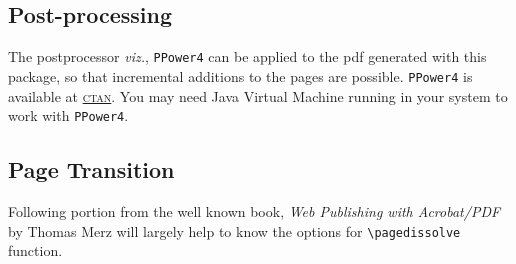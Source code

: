 \documentclass[a4paper]{article}
\begin{document}
\subsection{Post-processing}
The postprocessor \emph{viz.}, \verb+PPower4+ can be applied to the pdf
generated with this package, so that incremental additions to the pages
are possible. \verb+PPower4+ is available at
\href{ftp://ftp.dante.de/support/PPower4}{\textsc{ctan}}. You may need Java
Virtual Machine running in your system to work with \verb+PPower4+.

\subsection{Page Transition}

Following portion from the well known book, \emph{Web Publishing with
Acrobat/PDF} by Thomas Merz will largely help to know the options for
\verb+\pagedissolve+ function. 

\end{document}
